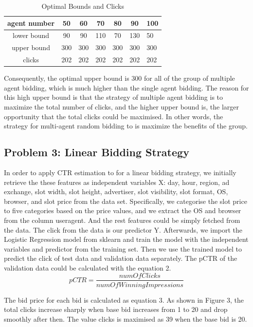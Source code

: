 \documentclass{sig-alternate-05-2015}
\begin{document}
\begin{table}
\centering
\caption{Optimal Bounds and Clicks}
\begin{tabular}{|c|c|c|c|c|c|l|} \hline
agent number&50&60&70&80&90&100\\ \hline
lower bound&90&90&110&70&130&50\\ \hline
upper bound&300&300&300&300&300&300\\ \hline
clicks&202& 202&202&202&202&202\\
\hline\end{tabular}
\end{table}

Consequently, the optimal upper bound is 300 for all of the group of multiple agent bidding, which is much higher than the single agent bidding. The reason for this high upper bound is that the strategy of multiple agent bidding is to maximize the total number of clicks, and the higher upper bound is, the larger opportunity that the total clicks could be maximised. In other words, the strategy for multi-agent random bidding to is maximize the benefits of the group.

\subsection{Problem 3: Linear Bidding Strategy}
In order to apply CTR estimation to for a linear bidding strategy, we initially retrieve the these features as independent variables X: day, hour, region, ad exchange, slot width, slot height, advertiser, slot visibility, slot format, OS, browser, and slot price from the data set. Specifically, we categorise the slot price to five categories based on the price values, and we extract the OS and browser from the column useragent. And the rest features could be simply fetched from the data. The click from the data is our predictor Y.
Afterwards, we import the Logistic Regression model from sklearn and train the model with the independent variables and predictor from the training set. Then we use the trained model to predict the click of test data and validation data separately. The pCTR of the validation data could be calculated with the equation 2.
\begin{equation}pCTR=\frac{numOfClicks}{numOfWinningImpressions}\end{equation}

The bid price for each bid is calculated as equation 3. As shown in Figure 3, the total clicks increase sharply when base bid increases from 1 to 20 and drop smoothly after then. The value clicks is maximised as 39 when the base bid is 20.
\end{document}
